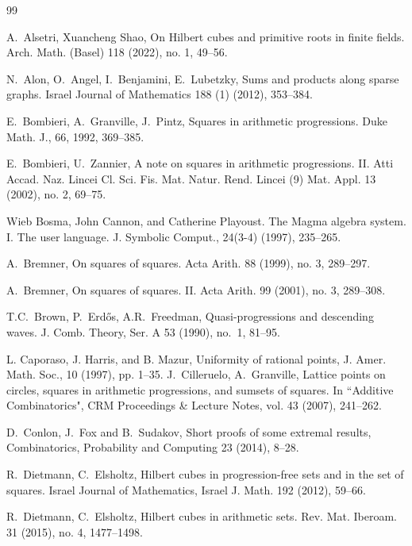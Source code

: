 \documentclass[10pt]{amsart}
\theoremstyle{plain}
\begin{document}
\begin{thebibliography}{99}

A.~Alsetri, Xuancheng  Shao,
On Hilbert cubes and primitive roots in finite fields.
Arch. Math. (Basel) 118 (2022), no. 1, 49--56. 

N.~Alon, O.~Angel, I.~Benjamini, E.~Lubetzky,
Sums and products along sparse graphs.
Israel Journal of Mathematics 188 (1) (2012), 353--384.

E.~Bombieri, A.~Granville, J.~Pintz, Squares in arithmetic progressions. Duke Math. J., 66, 1992, 369--385.

E.~Bombieri, U.~Zannier, A note on squares in arithmetic progressions. II.
Atti Accad. Naz. Lincei Cl. Sci. Fis. Mat. Natur. Rend. Lincei (9) Mat. Appl. 13 (2002), no. 2, 69--75. 



 Wieb Bosma, John Cannon, and Catherine Playoust. The Magma algebra system. I. The user language.  J. Symbolic Comput., 24(3-4) (1997), 235--265.

A.~Bremner,
On squares of squares.
Acta Arith. 88 (1999), no. 3, 289--297. 

A.~Bremner,
On squares of squares. II.
Acta Arith. 99 (2001), no. 3, 289--308. 

T.C.~Brown, P.~Erd\H{o}s, A.R.~Freedman,
Quasi-progressions and descending waves. 
J. Comb. Theory, Ser. A 53 (1990), no.~1, 81--95.

 L. Caporaso, J. Harris, and B. Mazur, Uniformity of rational points, J. Amer. Math. Soc., 10 (1997), pp. 1--35.
J.~Cilleruelo, A.~Granville,
Lattice points on circles, squares in arithmetic progressions, 
and sumsets of squares.
In ``Additive Combinatorics", CRM Proceedings \& Lecture Notes,
vol. 43 (2007), 241--262.

     D.~Conlon, J.~Fox and B.~Sudakov, Short proofs of some extremal results, Combinatorics, Probability and Computing 23 (2014), 8--28.


R.~Dietmann, C.~Elsholtz, 
Hilbert cubes in progression-free sets and in the set of squares.
Israel Journal of Mathematics, 
Israel J. Math. 192 (2012), 59--66.

R.~Dietmann, C.~Elsholtz, 
Hilbert cubes in arithmetic sets.
Rev. Mat. Iberoam. 31 (2015), no. 4, 1477--1498. 


\end{thebibliography}
\end{document}
